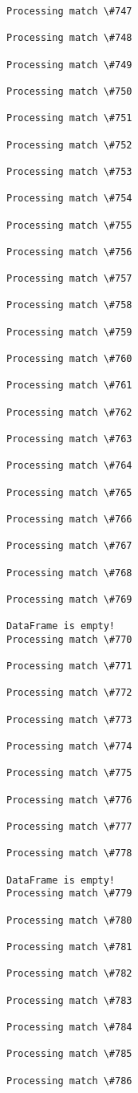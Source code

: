 \documentclass[11pt]{article}
\begin{document}
\begin{Verbatim}[commandchars=\\\{\}]
Processing match \#747

Processing match \#748

Processing match \#749

Processing match \#750

Processing match \#751

Processing match \#752

Processing match \#753

Processing match \#754

Processing match \#755

Processing match \#756

Processing match \#757

Processing match \#758

Processing match \#759

Processing match \#760

Processing match \#761

Processing match \#762

Processing match \#763

Processing match \#764

Processing match \#765

Processing match \#766

Processing match \#767

Processing match \#768

Processing match \#769

DataFrame is empty!
Processing match \#770

Processing match \#771

Processing match \#772

Processing match \#773

Processing match \#774

Processing match \#775

Processing match \#776

Processing match \#777

Processing match \#778

DataFrame is empty!
Processing match \#779

Processing match \#780

Processing match \#781

Processing match \#782

Processing match \#783

Processing match \#784

Processing match \#785

Processing match \#786


\end{Verbatim}
\end{document}
